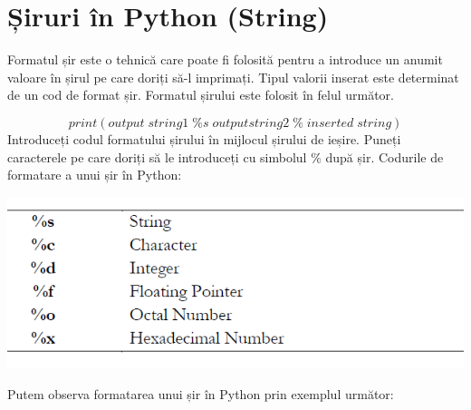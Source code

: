 \documentclass[oneside,20pt]{article}          %
\begin{document}
\section{Șiruri în Python (String)}
Formatul șir este o tehnică care poate fi folosită pentru a introduce un anumit
valoare în șirul pe care doriți să-l imprimați. Tipul valorii
inserat este determinat de un cod de format șir. Formatul șirului este folosit în felul următor.

$$ print(output\; string1\; \%s\; output string2\; \%\; inserted\; string)$$
Introduceți codul formatului șirului în mijlocul șirului de ieșire.
Puneți caracterele pe care doriți să le introduceți cu simbolul $\% $ după
șir.
Codurile de formatare a unui șir în Python:
\begin{center}
\includegraphics[height=3 cm]{9.png}
\end{center}
Putem observa formatarea unui șir în Python prin exemplul următor:
\end{document}
